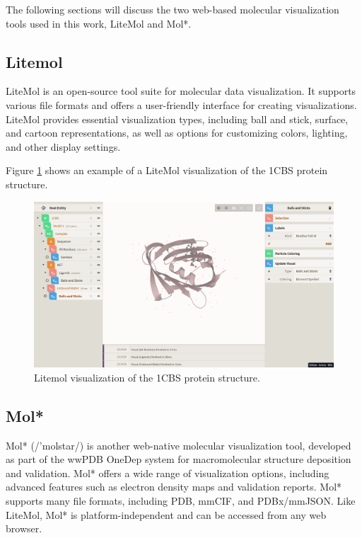 \documentclass[
  digital,     %
  oneside,     %
  nosansbold,  %
  nocolorbold, %
  lof,         %
  lot,         %
]{fithesis4}
\begin{document}
The following sections will discuss the two web-based molecular visualization tools used in this work, LiteMol and Mol*.

\subsection{Litemol}
\label{subsection:litemol}

LiteMol is an open-source tool suite for molecular data visualization. It supports various file formats and offers a user-friendly interface for creating visualizations. LiteMol provides essential visualization types, including ball and stick, surface, and cartoon representations, as well as options for customizing colors, lighting, and other display settings. \cite{sehnal2017litemol}

Figure \ref{fig:litemol} shows an example of a LiteMol visualization of the 1CBS protein structure. 

\begin{figure}[htbp]
  \begin{center}
    \includegraphics[width=\textwidth]{figures/litemol.png}
  \end{center}
  \caption{Litemol visualization of the 1CBS protein structure.}
  \label{fig:litemol}
\end{figure}

\subsection{Mol*}
\label{subsection:molstar}


Mol* (/'molstar/) is another web-native molecular visualization tool, developed as part of the wwPDB OneDep system for macromolecular structure deposition and validation. Mol* offers a wide range of visualization options, including advanced features such as electron density maps and validation reports. Mol* supports many file formats, including PDB, mmCIF, and PDBx/mmJSON. Like LiteMol, Mol* is platform-independent and can be accessed from any web browser. \cite{sehnal2021molstar}
\end{document}
